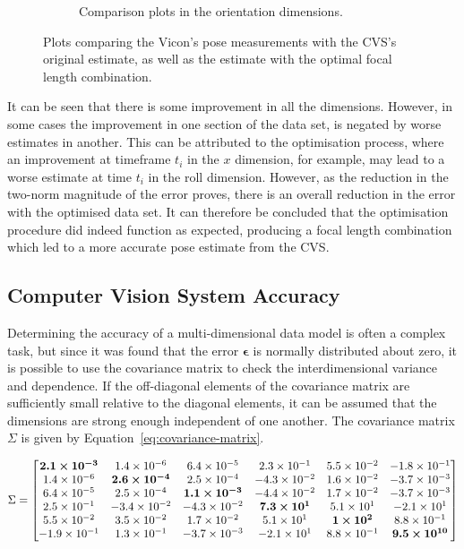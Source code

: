 \begin{figure}
\begin{subfigure}{0.48\textwidth}
\begin{subfigure}{\textwidth}
    \end{subfigure}
    \caption{Comparison plots in the orientation dimensions.}
  \end{subfigure}
  \caption[Plots comparing the Vicon's measurements with the CVS's original and improved measurements. ]{Plots comparing the Vicon's pose measurements with the CVS's original estimate, as well as the estimate with the optimal focal length combination.}
  \label{fig:estimate}
\end{figure}

It can be seen that there is some improvement in all the dimensions. However, in some cases the improvement in one section of the data set, is negated by worse estimates in another. This can be attributed to the optimisation process, where an improvement at timeframe $t_i$ in the $x$ dimension, for example, may lead to a worse estimate at time $t_i$ in the roll dimension. However, as the reduction in the two-norm magnitude of the error proves, there is an overall reduction in the error with the optimised data set. It can therefore be concluded that the optimisation procedure did indeed function as expected, producing a focal length combination which led to a more accurate pose estimate from the CVS. 

\subsection{Computer Vision System Accuracy}

Determining the accuracy of a multi-dimensional data model is often a complex task, but since it was found that the error $\bm{\epsilon}$ is normally distributed about zero, it is possible to use the covariance matrix to check the interdimensional variance and dependence. If the off-diagonal elements of the covariance matrix are sufficiently small relative to the diagonal elements, it can be assumed that the dimensions are strong enough independent of one another. The covariance matrix $\Sigma$ is given by Equation~\ref{eq:covariance-matrix}. 

\begin{equation}
  \label{eq:covariance-matrix}
  \Sigma = 
  \begin{bmatrix}
    \bm{2.1\times 10^{-3}} & 1.4\times 10^{-6}      & 6.4\times 10^{-5}       & 2.3\times 10^{-1}     &  5.5\times 10^{-2}   & -1.8\times 10^{-1}     \\ 
    1.4\times 10^{-6}      & \bm{2.6\times 10^{-4}} & 2.5\times 10^{-4}       & -4.3\times 10^{-2}    &  1.6\times 10^{-2}   & -3.7\times 10^{-3}     \\
    6.4\times 10^{-5}      & 2.5\times 10^{-4}      & \bm{1.1\times 10^{-3}}  & -4.4\times 10^{-2}    &  1.7\times 10^{-2}   & -3.7\times 10^{-3}     \\
    2.5\times 10^{-1}      & -3.4\times 10^{-2}     & -4.3\times 10^{-2}      & \bm{7.3\times 10^{1}} &  5.1\times 10^{1}    & -2.1\times 10^{1}      \\
    5.5\times 10^{-2}      & 3.5\times 10^{-2}      & 1.7\times 10^{-2}       & 5.1\times 10^{1}      &  \bm{1\times 10^{2}} & 8.8\times 10^{-1}      \\
    -1.9\times 10^{-1}     & 1.3\times 10^{-1}      & -3.7\times 10^{-3}      & -2.1\times 10^{1}     &  8.8\times 10^{-1}   & \bm{9.5\times 10^{10}} \\
  \end{bmatrix}
\end{equation}

